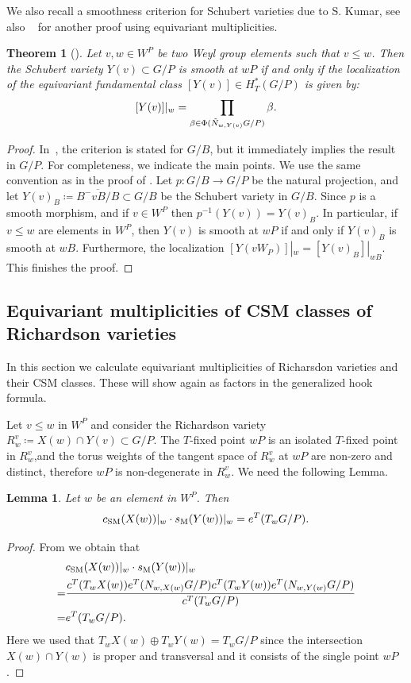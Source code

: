 \documentclass[11pt]{article}
\newtheorem{theorem}[theo]{Theorem}
\newtheorem{lemma}[theo]{Lemma}
\theoremstyle{definition}
\numberwithin{equation}{section}
\newcommand{\csm}{c_{\mathrm{SM}}}
\newcommand{\ssm}{s_{\mathrm{M}}}
\begin{document}
We also recall a smoothness criterion for Schubert varieties due to S. Kumar, see also ~\cite[page 255 (K)]{brion:eq-chow} for another proof using equivariant multiplicities.
\begin{theorem}[{\cite{kumar1996nil}}]\label{thm:kumar} 
	Let $v,w \in W^P$ be two Weyl group elements such that $v \le w$. Then the Schubert variety 
	$Y(v)\subset G/P$ is smooth at $wP$ if and only if the localization of the 
	equivariant fundamental class $ [Y(v)]\in H_T^*(G/P)$ is given by:
	\[ [Y(v)]|_{w}= \prod_{\beta\in  \Phi(\tilde{N}_{w,Y(v)} G/P)}\beta \/.\] 
\end{theorem}
\begin{proof} In~\cite{kumar1996nil}, the criterion is stated for $G/B$, but it immediately 
	implies the result in $G/P$. For completeness, we indicate the main points. We use the same convention as in the proof of .
	Let $p:G/B \to G/P$ be the natural projection, and let $Y(v)_B\coloneqq \overline{B^-vB/B}\subset G/B$ be the Schubert variety in $G/B$. Since $p$ is a smooth morphism, and if
	$v \in W^P$ then $p^{-1}(Y(v)) = Y(v)_B$. In particular, if $v \le w$ are elements in $W^P$, 
	then $Y(v)$ is smooth at $wP$ if and only if $Y(v)_B$ is smooth at $wB$. Furthermore, 
	the localization $[Y(vW_P)]|_{w} = [Y(v)_B]|_{wB}$. This finishes the proof.
\end{proof}




\subsection{Equivariant multiplicities of CSM classes of Richardson varieties} In this section we calculate 
equivariant multiplicities of Richarsdon varieties and their CSM classes. These will show again 
as factors in the generalized hook formula.

Let $v \le w$ in $W^P$ and consider the Richardson variety $R_w^{v}\coloneqq  X(w) \cap Y(v )\subset G/P$. The $T$-fixed point $wP$ is an isolated $T$-fixed point in $R_w^v$,and the torus weights of the tangent space of $R_w^v$ at $wP$ are non-zero and distinct, therefore $wP$ is non-degenerate in $R_w^v$. We need the following Lemma. 


\begin{lemma}\label{lemma:prodloc} Let $w$ be an element in $W^P$. Then 
	\[ \csm(X(w))|_w \cdot \ssm(Y(w))|_w = e^T(T_w G/P) \/. \]
\end{lemma}
\begin{proof} From  we obtain that
	\[ \begin{split} &\csm(X(w))|_w \cdot \ssm(Y(w))|_w \\
    =&  
		\frac{c^T( T_w X(w)) e^T (N_{w,X(w)} G/P) c^T( T_w Y(w)) e^T (N_{w,Y(w)} G/P)}{c^T (T_w G/P)} \\ 
		=& e^T (T_w G/P) \/. \end{split} \] 
	Here we used that $T_w X(w) \oplus T_w Y(w) = T_w G/P$ since the intersection $X(w) \cap Y(w)$
	is proper and transversal and it consists of the single point $wP$.\end{proof}
\end{document}
